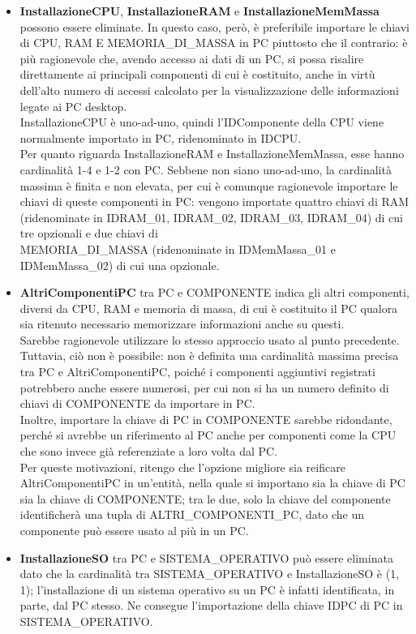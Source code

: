 \documentclass[a4paper,12pt]{report}
\begin{document}
\begin{itemize}
	\item \textbf{InstallazioneCPU}, \textbf{InstallazioneRAM} e \textbf{InstallazioneMemMassa} possono essere eliminate. In questo caso, però, è preferibile importare le chiavi di CPU, RAM E MEMORIA\_DI\_MASSA in PC piuttosto che il contrario: è più ragionevole che, avendo accesso ai dati di un PC, si possa risalire direttamente ai principali componenti di cui è costituito, anche in virtù dell'alto numero di accessi calcolato per la visualizzazione delle informazioni legate ai PC desktop.
		\\ InstallazioneCPU è uno-ad-uno, quindi l'IDComponente della CPU viene normalmente importato in PC, ridenominato in IDCPU.
		\\ Per quanto riguarda InstallazioneRAM e InstallazioneMemMassa, esse hanno cardinalità 1-4 e 1-2 con PC. Sebbene non siano uno-ad-uno, la cardinalità massima è finita e non elevata, per cui è comunque ragionevole importare le chiavi di queste componenti in PC: vengono importate quattro chiavi di RAM (ridenominate in IDRAM\_01, IDRAM\_02, IDRAM\_03, IDRAM\_04) di cui tre opzionali e due chiavi di \\ MEMORIA\_DI\_MASSA (ridenominate in IDMemMassa\_01 e IDMemMassa\_02) di cui una opzionale.
	\item \textbf{AltriComponentiPC} tra PC e COMPONENTE indica gli altri componenti, diversi da CPU, RAM e memoria di massa, di cui è costituito il PC qualora sia ritenuto necessario memorizzare informazioni anche su questi.
		\\ Sarebbe ragionevole utilizzare lo stesso approccio usato al punto precedente. Tuttavia, ciò non è possibile: non è definita una cardinalità massima precisa tra PC e AltriComponentiPC, poiché i componenti aggiuntivi registrati potrebbero anche essere numerosi, per cui non si ha un numero definito di chiavi di COMPONENTE da importare in PC. 
		\\ Inoltre, importare la chiave di PC in COMPONENTE sarebbe ridondante, perché si avrebbe un riferimento al PC anche per componenti come la CPU che sono invece già referenziate a loro volta dal PC.
		\\ Per queste motivazioni, ritengo che l'opzione migliore sia reificare AltriComponentiPC in un'entità, nella quale si importano sia la chiave di PC sia la chiave di COMPONENTE; tra le due, solo la chiave del componente identificherà una tupla di ALTRI\_COMPONENTI\_PC, dato che un componente può essere usato al più in un PC.
	\item \textbf{InstallazioneSO} tra PC e SISTEMA\_OPERATIVO può essere eliminata dato che la cardinalità tra SISTEMA\_OPERATIVO e InstallazioneSO è (1, 1); l'installazione di un sistema operativo su un PC è infatti identificata, in parte, dal PC stesso. Ne consegue l'importazione della chiave IDPC di PC in SISTEMA\_OPERATIVO.

\end{itemize}
\end{document}
